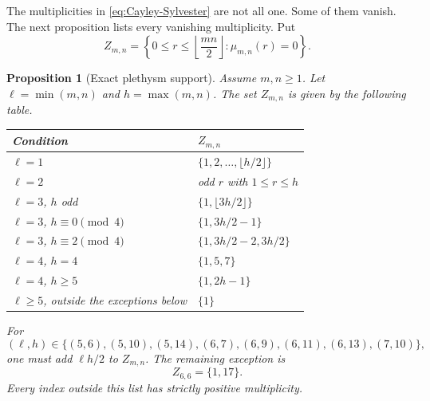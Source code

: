 \documentclass[11pt,reqno]{amsart}
\newtheorem{proposition}[theorem]{Proposition}
\theoremstyle{definition}
\theoremstyle{remark}
\begin{document}
The multiplicities in \eqref{eq:Cayley-Sylvester} are not all one.  Some of
them vanish.  The next proposition lists every vanishing multiplicity.  Put
\begin{equation*}
 Z_{m,n}=\left\{0\leq r\leq\left\lfloor\frac{mn}{2}\right\rfloor:
 \mu_{m,n}(r)=0\right\}.
\end{equation*}

\begin{proposition}[Exact plethysm support]\label{prop:plethysm-support}
Assume $m,n\geq1$.  Let $\ell=\min(m,n)$ and $h=\max(m,n)$.  The set
$Z_{m,n}$ is given by the
following table.
\begin{center}
\begin{tabular}{@{}ll@{}}
\toprule
Condition & $Z_{m,n}$ \\
\midrule
$\ell=1$ & $\{1,2,\ldots,\lfloor h/2\rfloor\}$ \\
$\ell=2$ & odd $r$ with $1\leq r\leq h$ \\
$\ell=3$, $h$ odd & $\{1,\lfloor3h/2\rfloor\}$ \\
$\ell=3$, $h\equiv0\pmod4$ & $\{1,3h/2-1\}$ \\
$\ell=3$, $h\equiv2\pmod4$ & $\{1,3h/2-2,3h/2\}$ \\
$\ell=4$, $h=4$ & $\{1,5,7\}$ \\
$\ell=4$, $h\geq5$ & $\{1,2h-1\}$ \\
$\ell\geq5$, outside the exceptions below & $\{1\}$ \\
\bottomrule
\end{tabular}
\end{center}
For
\begin{equation}\label{eq:PP-exceptions}
 (\ell,h)\in
 \{(5,6),(5,10),(5,14),(6,7),(6,9),(6,11),(6,13),(7,10)\},
\end{equation}
one must add $\ell h/2$ to $Z_{m,n}$.  The remaining exception is
\begin{equation*}
 Z_{6,6}=\{1,17\}.
\end{equation*}
Every index outside this list has strictly positive multiplicity.
\end{proposition}
\end{document}
